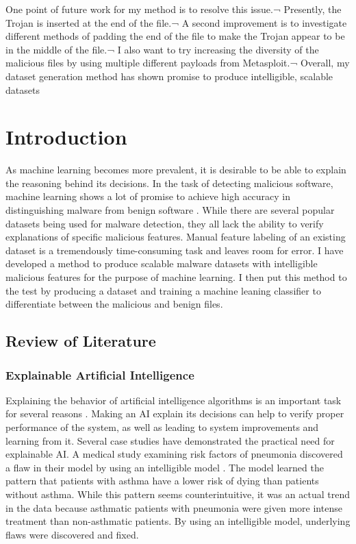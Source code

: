 \documentclass[12pt, letterpaper, titlepage]{article}
\newcommand{\metasploit}{Metasploit}
\begin{document}
\par One point of future work for my method is to resolve this issue.¬
Presently, the Trojan is inserted at the end of the file.¬
A second improvement is to investigate different methods of padding the end of the file to make the Trojan appear to be in the middle of the file.¬
I also want to try increasing the diversity of the malicious files by using multiple different payloads from \metasploit{}.¬
Overall, my dataset generation method has shown promise to produce intelligible, scalable datasets

\pagebreak

\section{Introduction}
\par As machine learning becomes more prevalent, it is desirable to be able to explain the reasoning behind its decisions.
In the task of detecting malicious software, machine learning shows a lot of promise to achieve high accuracy in distinguishing malware from benign software \cite{Kancherla, SantacroceMaV, Raff2017, Sgandurra, Ronen2018}.
While there are several popular datasets being used for malware detection, they all lack the ability to verify explanations of specific malicious features.
Manual feature labeling of an existing dataset is a tremendously time-consuming task and leaves room for error.
I have developed a method to produce scalable malware datasets with intelligible malicious features for the purpose of machine learning.
I then put this method to the test by producing a dataset and training a machine leaning classifier to differentiate between the malicious and benign files.

\subsection{Review of Literature}
\subsubsection{Explainable Artificial Intelligence}
\par Explaining the behavior of artificial intelligence algorithms is an important task for several reasons \cite{Biggers2014, Gunning2015}.
Making an AI explain its decisions can help to verify proper performance of the system, as well as leading to system improvements and learning from it.
Several case studies have demonstrated the practical need for explainable AI.
A medical study examining risk factors of pneumonia discovered a flaw in their model by using an intelligible model \cite{Caruana2015}.
The model learned the pattern that patients with asthma have a lower risk of dying than patients without asthma.
While this pattern seems counterintuitive, it was an actual trend in the data because asthmatic patients with pneumonia were given more intense treatment than non-asthmatic patients.
By using an intelligible model, underlying flaws were discovered and fixed.
\end{document}
